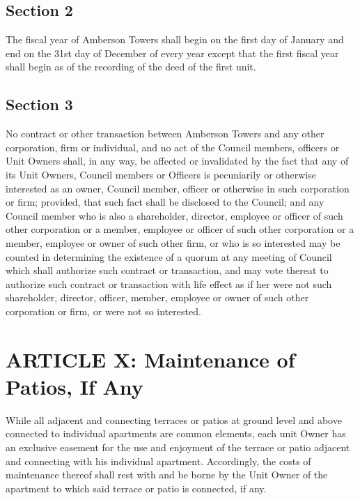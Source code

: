 \documentclass[
]{book}
\begin{document}
\hypertarget{section-2-7}{%
\subsection*{Section 2}\label{section-2-7}}

The fiscal year of Amberson Towers shall begin on the first day of January and end on the 31st day of December of every year except that the first fiscal year shall begin as of the recording of the deed of the first unit.

\hypertarget{section-3-4}{%
\subsection*{Section 3}\label{section-3-4}}

No contract or other transaction between Amberson Towers and any other corporation, firm or individual, and no act of the Council members, officers or Unit Owners shall, in any way, be affected or invalidated by the fact that any of its Unit Owners, Council members or Officers is pecuniarily or otherwise interested as an owner, Council member, officer or otherwise in such corporation or firm; provided, that such fact shall be disclosed to the Council; and any Council member who is also a shareholder, director, employee or officer of such other corporation or a member, employee or officer of such other corporation or a member, employee or owner of such other firm, or who is so interested may be counted in determining the existence of a quorum at any meeting of Council which shall authorize such contract or transaction, and may vote thereat to authorize such contract or transaction with life effect as if her were not such shareholder, director, officer, member, employee or owner of such other corporation or firm, or were not so interested.

\hypertarget{article-x-maintenance-of-patios-if-any}{%
\section*{ARTICLE X: Maintenance of Patios, If Any}\label{article-x-maintenance-of-patios-if-any}}

While all adjacent and connecting terraces or patios at ground level and above connected to individual apartments are common elements, each unit Owner has an exclusive easement for the use and enjoyment of the terrace or patio adjacent and connecting with his individual apartment. Accordingly, the costs of maintenance thereof shall rest with and be borne by the Unit Owner of the apartment to which said terrace or patio is connected, if any.
\end{document}

